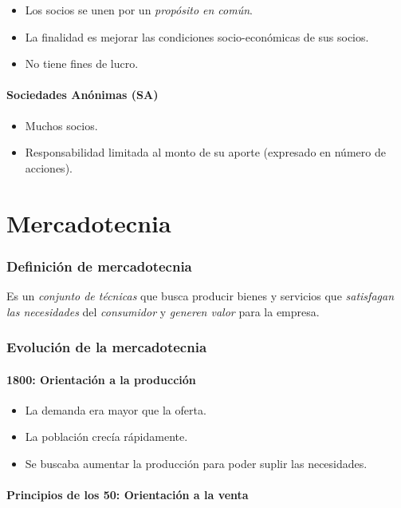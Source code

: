 \documentclass[10pt, spanish, a5paper]{article}
\begin{document}
\begin{itemize}
	\item Los socios se unen por un \emph{propósito en común}.
	\item La finalidad es mejorar las condiciones socio-económicas de sus socios.
	\item No tiene fines de lucro.
\end{itemize}


\subsection{Sociedades Anónimas (SA)}
\begin{itemize}
	\item Muchos socios.
	\item Responsabilidad limitada al monto de su aporte (expresado en número de acciones).
\end{itemize}



\part{Mercadotecnia}

\section{Definición de mercadotecnia}
Es un \emph{conjunto de técnicas} que busca producir bienes y servicios que \emph{satisfagan las necesidades} del \emph{consumidor} y \emph{generen valor} para la empresa.

\section{Evolución de la mercadotecnia}

\subsection{1800: Orientación a la producción}

\begin{itemize}
	\item La demanda era mayor que la oferta.
	\item La población crecía rápidamente.
	\item Se buscaba aumentar la producción para poder suplir las necesidades.
\end{itemize}

\subsection{Principios de los 50: Orientación a la venta}
\end{document}
